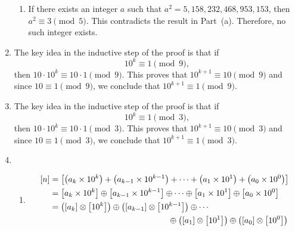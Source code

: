 \begin{enumerate}
\begin{enumerate}
\item If there exists an integer $a$ such that $a^2 = 5,158,232,468,953,153$, then 
$a^2 \equiv 3 \pmod 5$.  This contradicts the result in Part~(a).  Therefore, no such integer exists.
\end{enumerate}




\item The key idea in the inductive step of the proof is that if
\[
10^k \equiv 1 \pmod 9,
\]
then $10 \cdot 10^k \equiv 10 \cdot 1 \pmod 9$.  This proves that $10^{k+1} \equiv 10 \pmod 9$ and since $10 \equiv 1 \pmod 9$, we conclude that $10^{k+1} \equiv 1 \pmod 9$.


\item The key idea in the inductive step of the proof is that if
\[
10^k \equiv 1 \pmod 3,
\]
then $10 \cdot 10^k \equiv 10 \cdot 1 \pmod 3$.  This proves that $10^{k+1} \equiv 10 \pmod 3$ and since $10 \equiv 1 \pmod 3$, we conclude that $10^{k+1} \equiv 1 \pmod 3$.


\item \begin{enumerate}
\item 
\begin{align}
  \left[ n \right] &= \left[ {\left( {a_k  \times 10^k } \right) + \left( {a_{k - 1}  \times 10^{k - 1} } \right) +  \cdots  + \left( {a_1  \times 10^1 } \right) + \left( {a_0  \times 10^0 } \right)} \right] \notag \\ 
   &= \left[ {a_k  \times 10^k } \right] \oplus \left[ {a_{k - 1}  \times 10^{k - 1} } \right] \oplus  \cdots  \oplus \left[ {a_1  \times 10^1 } \right] \oplus \left[ {a_0  \times 10^0 } \right] \notag \\
  &= \left( {\left[ {a_k } \right] \otimes \left[ {10^k } \right]} \right) \oplus \left( {\left[ {a_{k - 1} } \right] \otimes \left[ {10^{k - 1} } \right]} \right) \oplus  \cdots \notag \\ 
  & \hspace{5cm} \oplus \left( {\left[ {a_1 } \right] \otimes \left[ {10^1 } \right]} \right) \oplus \left( {\left[ {a_0 } \right] \otimes \left[ {10^0 } \right]} \right) \notag  
\end{align}


\end{enumerate}
\end{enumerate}

